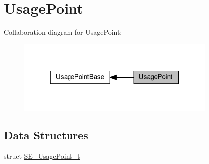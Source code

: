 \hypertarget{group__UsagePoint}{}\section{Usage\+Point}
\label{group__UsagePoint}
Collaboration diagram for Usage\+Point\+:\nopagebreak
\begin{figure}[H]
\begin{center}
\leavevmode
\includegraphics[width=274pt]{group__UsagePoint}
\end{center}
\end{figure}
\subsection*{Data Structures}
\begin{DoxyCompactItemize}
\item 
struct \hyperlink{structSE__UsagePoint__t}{S\+E\+\_\+\+Usage\+Point\+\_\+t}
\end{DoxyCompactItemize}

